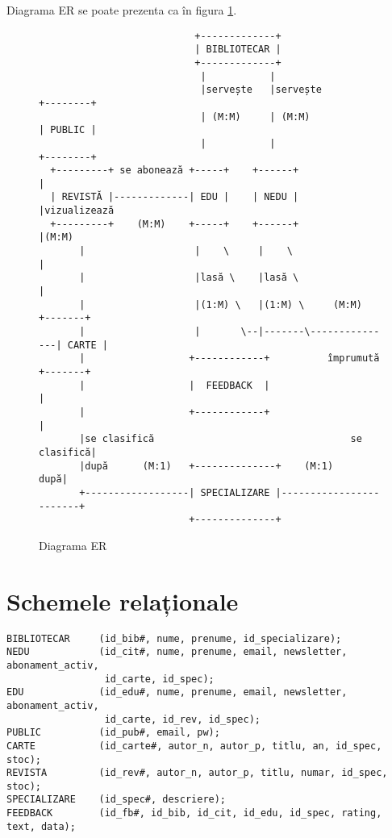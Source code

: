 Diagrama ER se poate prezenta ca în figura \ref{fig:erd}.
\begin{figure}[!htbp]
    \small
    \begin{verbatim}
                           +-------------+
                           | BIBLIOTECAR |
                           +-------------+
                            |           |
                            |servește   |servește              +--------+ 
                            | (M:M)     | (M:M)                | PUBLIC |
                            |           |                      +--------+
  +---------+ se abonează +-----+    +------+                      |
  | REVISTĂ |-------------| EDU |    | NEDU |                      |vizualizează
  +---------+    (M:M)    +-----+    +------+                      |(M:M)
       |                   |    \     |    \                       |
       |                   |lasă \    |lasă \                      |
       |                   |(1:M) \   |(1:M) \     (M:M)      +-------+
       |                   |       \--|-------\---------------| CARTE |
       |                  +------------+          împrumută   +-------+
       |                  |  FEEDBACK  |                          |
       |                  +------------+                          |
       |se clasifică                                  se clasifică|
       |după      (M:1)   +--------------+    (M:1)           după|
       +------------------| SPECIALIZARE |------------------------+
                          +--------------+
    \end{verbatim}
    \caption{Diagrama ER}
    \label{fig:erd}
\end{figure}


\section{Schemele relaționale}
\label{sec:scheme-rel}

\begin{verbatim}
BIBLIOTECAR     (id_bib#, nume, prenume, id_specializare);
NEDU            (id_cit#, nume, prenume, email, newsletter, abonament_activ,
                 id_carte, id_spec);
EDU             (id_edu#, nume, prenume, email, newsletter, abonament_activ,
                 id_carte, id_rev, id_spec);
PUBLIC          (id_pub#, email, pw);
CARTE           (id_carte#, autor_n, autor_p, titlu, an, id_spec, stoc);
REVISTA         (id_rev#, autor_n, autor_p, titlu, numar, id_spec, stoc);
SPECIALIZARE    (id_spec#, descriere);
FEEDBACK        (id_fb#, id_bib, id_cit, id_edu, id_spec, rating, text, data);
\end{verbatim}

